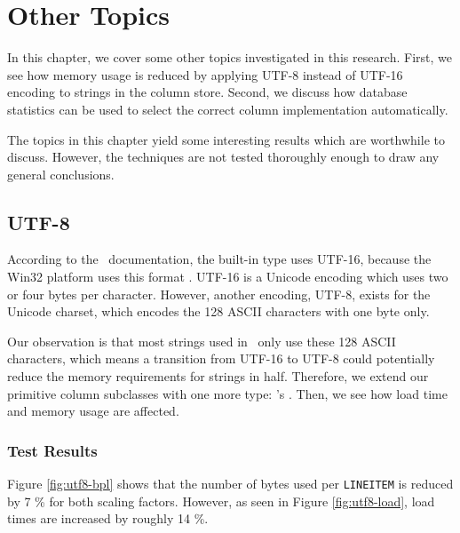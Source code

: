 \chapter{Other Topics}
\label{chap:misc}
In this chapter, we cover some other topics investigated in this research. First, we see how memory usage is reduced by applying UTF-8 instead of UTF-16 encoding to strings in the column store. Second, we discuss how database statistics can be used to select the correct column implementation automatically.

The topics in this chapter yield some interesting results which are worthwhile to discuss. However, the techniques are not tested thoroughly enough to draw any general conclusions.

\clearpage

\section{UTF-8}
\label{sec:UTF-8}
According to the \delphi~documentation, the built-in  type uses UTF-16, because the Win32 platform uses this format \cite{noauthor_undated-cp}. UTF-16 is a Unicode encoding which uses two or four bytes per character. However, another encoding, UTF-8, exists for the Unicode charset, which encodes the 128 ASCII characters with one byte only.

Our observation is that most strings used in \gap~only use these 128 ASCII characters, which means a transition from UTF-16 to UTF-8 could potentially reduce the memory requirements for strings in half. Therefore, we extend our primitive column subclasses with one more type: \delphi's . Then, we see how load time and memory usage are affected.

\subsection{Test Results}
\label{sub:Test Results}

Figure \ref{fig:utf8-bpl} shows that the number of bytes used per \texttt{LINEITEM} is reduced by 7 \% for both scaling factors. However, as seen in Figure \ref{fig:utf8-load}, load times are increased by roughly 14 \%. 

